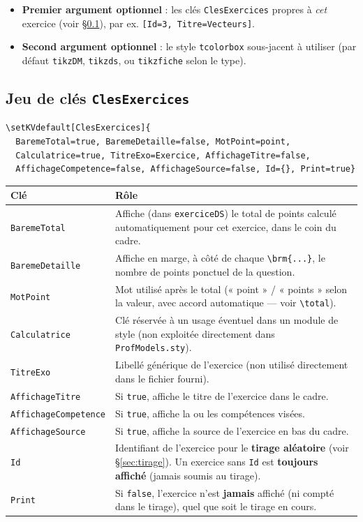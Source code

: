 \documentclass[11pt,a4paper]{article}
\newcommand{\cmdname}[1]{\texttt{\textbackslash#1}}
\begin{document}
\begin{itemize}
  \item \textbf{Premier argument optionnel} : les clés \texttt{ClesExercices} propres à \textit{cet} exercice (voir \S\ref{sec:clesexercices}), par ex. \texttt{[Id=3, Titre=Vecteurs]}.
  \item \textbf{Second argument optionnel} : le style \texttt{tcolorbox} sous-jacent à utiliser (par défaut \texttt{tikzDM}, \texttt{tikzds}, ou \texttt{tikzfiche} selon le type).
\end{itemize}

\subsection{Jeu de clés \texttt{ClesExercices}}
\label{sec:clesexercices}

\begin{lstlisting}
\setKVdefault[ClesExercices]{
  BaremeTotal=true, BaremeDetaille=false, MotPoint=point,
  Calculatrice=true, TitreExo=Exercice, AffichageTitre=false,
  AffichageCompetence=false, AffichageSource=false, Id={}, Print=true}
\end{lstlisting}

\begin{longtable}{@{}p{3.6cm}p{11cm}@{}}
\toprule
\textbf{Clé} & \textbf{Rôle} \\
\midrule
\endhead
\texttt{BaremeTotal} & Affiche (dans \texttt{exerciceDS}) le total de points calculé automatiquement pour cet exercice, dans le coin du cadre. \\[4pt]
\texttt{BaremeDetaille} & Affiche en marge, à côté de chaque \cmdname{brm\{...\}}, le nombre de points ponctuel de la question. \\[4pt]
\texttt{MotPoint} & Mot utilisé après le total (« point » / « points » selon la valeur, avec accord automatique — voir \cmdname{total}). \\[4pt]
\texttt{Calculatrice} & Clé réservée à un usage éventuel dans un module de style (non exploitée directement dans \texttt{ProfModels.sty}). \\[4pt]
\texttt{TitreExo} & Libellé générique de l'exercice (non utilisé directement dans le fichier fourni). \\[4pt]
\texttt{AffichageTitre} & Si \texttt{true}, affiche le titre de l'exercice dans le cadre. \\[4pt]
\texttt{AffichageCompetence} & Si \texttt{true}, affiche la ou les compétences visées. \\[4pt]
\texttt{AffichageSource} & Si \texttt{true}, affiche la source de l'exercice en bas du cadre. \\[4pt]
\texttt{Id} & Identifiant de l'exercice pour le \textbf{tirage aléatoire} (voir \S\ref{sec:tirage}). Un exercice sans \texttt{Id} est \textbf{toujours affiché} (jamais soumis au tirage). \\[4pt]
\texttt{Print} & Si \texttt{false}, l'exercice n'est \textbf{jamais} affiché (ni compté dans le tirage), quel que soit le tirage en cours. \\
\bottomrule
\end{longtable}
\end{document}
